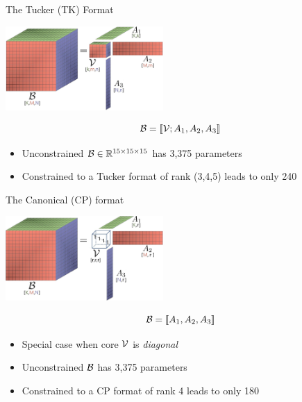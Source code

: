 \documentclass{beamer}
\begin{document}
\begin{frame}{The Tucker (TK)  Format}
\vspace*{-0.3cm}


\begin{center}
\includegraphics[width=6cm]{figures/tucker-paper.jpg}
\end{center}
\vspace*{-0.5cm}
$$
\mathcal B = [\![ \mathcal V; A_1,A_2,A_3]\!]
$$

\begin{itemize}
\item Unconstrained $\mathcal B\in \mathbb{R}^{15\times 15\times 15}$ has 3,375 parameters
\item Constrained to a Tucker format of rank (3,4,5) leads to only 240
\end{itemize}
\end{frame}







\begin{frame}{The Canonical (CP)  format}

\begin{center}
     \includegraphics[width=6cm]{figures/CPpaper.jpg}
\end{center}
\vspace*{-0.5cm}
$$\mathcal B = [\![ A_1,A_2,A_3]\!]$$ 
\vspace*{-0.5cm}
\begin{itemize}
\item Special case when core $\mathcal V$ is \textit{diagonal}
\item Unconstrained $\mathcal B$ has 3,375 parameters
\item Constrained to a CP format of rank 4 leads to only 180
\end{itemize}

\end{frame}
\end{document}
